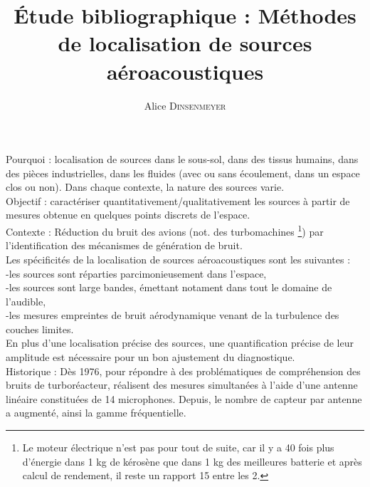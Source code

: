 \documentclass[twocolumn, 11pt, landscape]{article}
\title{
\centering \fontsize{18pt}{10pt}\textbf{Étude bibliographique : Méthodes de localisation de sources aéroacoustiques}
}
\author{
\large{Alice \textsc{Dinsenmeyer}}\\[2mm] %
\vspace{-5mm}
}
\date{}
\begin{document}
\maketitle %

\thispagestyle{fancy} %




Pourquoi : localisation de sources dans le sous-sol, dans des tissus humains, dans des pièces industrielles, dans les fluides (avec ou sans écoulement, dans un espace clos ou non). Dans chaque contexte, la nature des sources varie.\\

Objectif : caractériser quantitativement/qualitativement les sources à partir de mesures obtenue en quelques points  discrets de l'espace.\\

Contexte : Réduction du bruit des avions (not. des turbomachines \footnote{Le moteur électrique n'est pas pour tout de suite, car il y a 40 fois plus d'énergie dans 1 kg de kérosène que dans 1 kg des meilleures batterie et après calcul de rendement, il reste un rapport 15 entre les 2.}) par l'identification des mécanismes de génération de bruit.\\

Les spécificités de la localisation de sources aéroacoustiques sont les suivantes : \\
-les sources sont réparties parcimonieusement dans l'espace,\\
-les sources sont large bandes, émettant notament dans tout le domaine de l'audible,\\
-les mesures empreintes de bruit aérodynamique venant de la turbulence des couches limites.\\
En plus d'une localisation précise des sources, une quantification précise de leur amplitude est nécessaire pour un bon ajustement du diagnostique.\\

Historique : Dès 1976, pour répondre à des problématiques de compréhension des bruits de turboréacteur, \cite{Billingsley1976} réalisent des mesures simultanées à l'aide d'une antenne linéaire constituées de 14 microphones. Depuis, le nombre de capteur par antenne a augmenté, ainsi la gamme fréquentielle.
\end{document}
